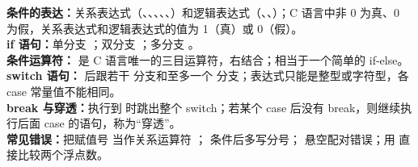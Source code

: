 \documentclass[a4paper,11pt]{article}
\begin{document}

\begin{knowmap}
\textbf{条件的表达：}关系表达式（\code{>}、\code{>=}、\code{<}、\code{<=}、\code{==}、\code{!=}）和逻辑表达式（\code{!}、\code{\&\&}、\code{||}）；C 语言中非 0 为真、0 为假，关系表达式和逻辑表达式的值为 1（真）或 0（假）。\\[2pt]
\textbf{if 语句：}单分支 ；双分支 ；多分支 。\\[2pt]
\textbf{条件运算符：} 是 C 语言唯一的三目运算符，右结合；相当于一个简单的 if-else。\\[2pt]
\textbf{switch 语句：} 后跟若干  分支和至多一个  分支；表达式只能是整型或字符型，各 case 常量值不能相同。\\[2pt]
\textbf{break 与穿透：}执行到  时跳出整个 switch；若某个 case 后没有 break，则继续执行后面 case 的语句，称为“穿透”。\\[2pt]
\textbf{常见错误：}把赋值号 \code{=} 当作关系运算符 \code{==}； 条件后多写分号； 悬空配对错误；用 \code{==} 直接比较两个浮点数。
\end{knowmap}
\end{document}
